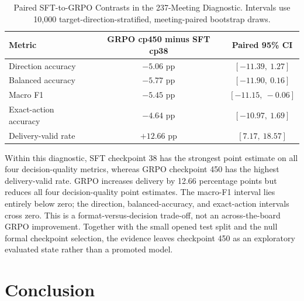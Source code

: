 \begin{table}[htbp]
    \centering
    \footnotesize
    \begin{tabular}{lcc}
        \toprule
        \textbf{Metric} & \textbf{GRPO cp450 minus SFT cp38} & \textbf{Paired 95\% CI} \\
        \midrule
        Direction accuracy & $-5.06$ pp & $[-11.39,\ 1.27]$ \\
        Balanced accuracy & $-5.77$ pp & $[-11.90,\ 0.16]$ \\
        Macro F1 & $-5.45$ pp & $[-11.15,\ -0.06]$ \\
        Exact-action accuracy & $-4.64$ pp & $[-10.97,\ 1.69]$ \\
        Delivery-valid rate & $+12.66$ pp & $[7.17,\ 18.57]$ \\
        \bottomrule
    \end{tabular}
    \caption{Paired SFT-to-GRPO Contrasts in the 237-Meeting Diagnostic. Intervals use 10,000 target-direction-stratified, meeting-paired bootstrap draws.}
    \label{tab:ch2:decision_all237_contrasts}
\end{table}

Within this diagnostic, SFT checkpoint 38 has the strongest point estimate on
all four decision-quality metrics, whereas GRPO checkpoint 450 has the highest
delivery-valid rate. GRPO increases delivery by 12.66 percentage points but
reduces all four decision-quality point estimates. The macro-F1 interval lies
entirely below zero; the direction, balanced-accuracy, and exact-action
intervals cross zero. This is a format-versus-decision trade-off, not an
across-the-board GRPO improvement. Together with the small opened test split
and the null formal checkpoint selection, the evidence leaves checkpoint 450
as an exploratory evaluated state rather than a promoted model.






\section{Conclusion}\label{ch2:sec:conclusion}


